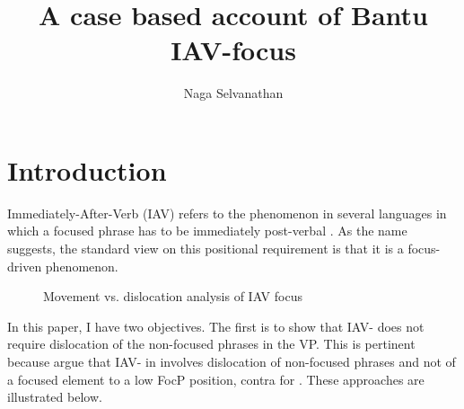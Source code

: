 \documentclass[output=paper,newtxmath,modfonts,nonflat,hidelinks]{langsci/langscibook}
\title{A case based account of Bantu IAV-focus}
\author{Naga Selvanathan\affiliation{Rutgers University}}
\begin{document}
\maketitle
\section{Introduction}

 Immediately-After-Verb (IAV)  refers to the phenomenon in several  languages in which a focused phrase has to be immediately post-verbal \citep{hyman1979nounstructure,watters1979}. As the name suggests, the standard view on this positional requirement is that it is a focus-driven phenomenon. 
 

\begin{figure}
%
%

\caption{Movement vs. dislocation analysis of IAV focus}
\label{fig:selvanathan:1}

\end{figure} 

 

 In this paper, I have two objectives. The first is to show that  IAV- does not require dislocation of the non-focused phrases in the VP. This is pertinent because \citet{chengdowning2012} argue that IAV- in  involves dislocation of non-focused phrases and not  of a focused element to a low FocP position, contra \citet{vanderwal2006} for . These approaches are illustrated below.
 
\end{document}
